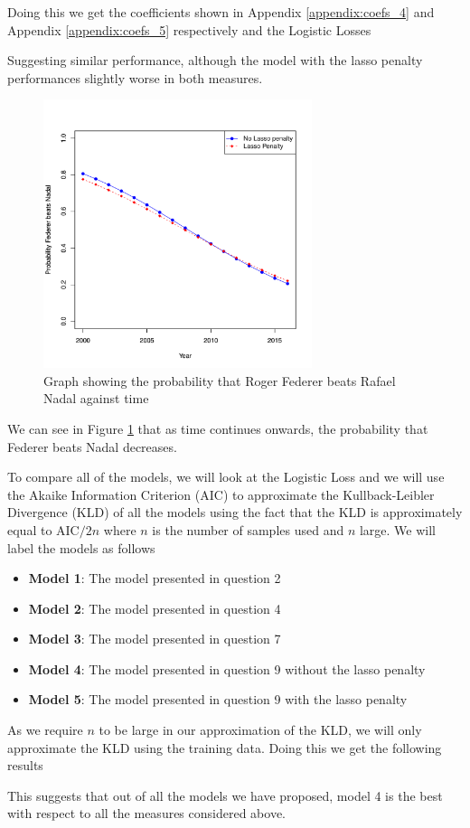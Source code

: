 \documentclass[11pt]{article} %
\begin{document}
Doing this we get the coefficients shown in Appendix \ref{appendix:coefs_4} and Appendix \ref{appendix:coefs_5} respectively and the Logistic Losses


Suggesting similar performance, although the model with the lasso penalty performances slightly worse in both measures.

\begin{figure}[h]
	\centering
	\includegraphics[width=0.7\textwidth]{"../R File/federer_nadal_probs"}
	\caption{Graph showing the probability that Roger Federer beats Rafael Nadal against time}
	\label{fig:federer_vs_nadal}
\end{figure}

We can see in Figure \ref{fig:federer_vs_nadal} that as time continues onwards, the probability that Federer beats Nadal decreases.

To compare all of the models, we will look at the Logistic Loss and we will use the Akaike Information Criterion (AIC) to approximate the Kullback-Leibler Divergence (KLD) of all the models using the fact that the KLD is approximately equal to AIC$/2n$ where $n$ is the number of samples used and $n$ large. We will label the models as follows
\begin{itemize}
	\item \textbf{Model 1}: The model presented in question 2
	\item \textbf{Model 2}: The model presented in question 4
	\item \textbf{Model 3}: The model presented in question 7
	\item \textbf{Model 4}: The model presented in question 9 without the lasso penalty
	\item \textbf{Model 5}: The model presented in question 9 with the lasso penalty
\end{itemize}
As we require $n$ to be large in our approximation of the KLD, we will only approximate the KLD using the training data. Doing this we get the following results

This suggests that out of all the models we have proposed, model 4 is the best with respect to all the measures considered above.
\end{document}
